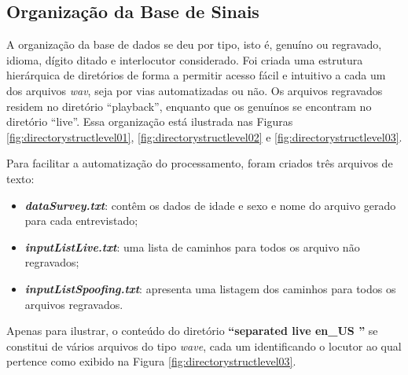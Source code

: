 	    \subsection{Organização da Base de Sinais}
		\par A organização da base de dados se deu por tipo, isto é, genuíno ou regravado, idioma, dígito ditado e interlocutor considerado. Foi criada uma estrutura hierárquica de diretórios de forma a permitir acesso fácil e intuitivo a cada um dos arquivos \textit{wav}, seja por vias automatizadas ou não. Os arquivos regravados residem no diretório ``playback'', enquanto que os genuínos se encontram no diretório ``live''.	Essa organização está ilustrada nas Figuras \ref{fig:directorystructlevel01}, \ref{fig:directorystructlevel02} e \ref{fig:directorystructlevel03}.
		
		\par Para facilitar a automatização do processamento, foram criados três arquivos de texto:
		\begin{itemize}
			\item \textit{\textbf{dataSurvey.txt}}: contêm os dados de idade e sexo e nome do arquivo gerado para cada entrevistado;
			\item \textit{\textbf{inputListLive.txt}}: uma lista de caminhos para todos os arquivo não regravados;
			\item \textit{\textbf{inputListSpoofing.txt}}: apresenta uma listagem dos caminhos para todos os arquivos regravados.
		\end{itemize}
	
		\par Apenas para ilustrar, o conteúdo do diretório \textbf{``separated \textfractionsolidus live \textfractionsolidus en\_US ''} se constitui de vários arquivos do tipo \textit{wave}, cada um identificando o locutor ao qual pertence como exibido na Figura \ref{fig:directorystructlevel03}.

